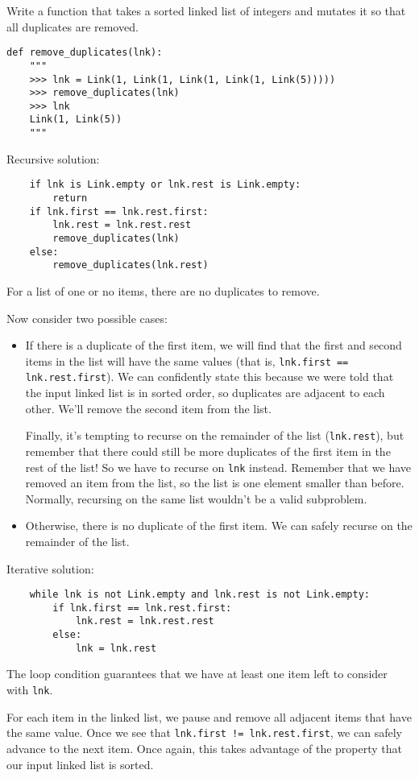 \question
Write a function that takes a sorted linked list of integers and mutates
it so that all duplicates are removed.

\begin{lstlisting}
def remove_duplicates(lnk):
    """
    >>> lnk = Link(1, Link(1, Link(1, Link(1, Link(5)))))
    >>> remove_duplicates(lnk)
    >>> lnk
    Link(1, Link(5))
    """
\end{lstlisting}
\begin{solution}[1.75in]
Recursive solution:
\begin{lstlisting}
    if lnk is Link.empty or lnk.rest is Link.empty:
        return
    if lnk.first == lnk.rest.first:
        lnk.rest = lnk.rest.rest
        remove_duplicates(lnk)
    else:
        remove_duplicates(lnk.rest)
\end{lstlisting}
For a list of one or no items, there are no duplicates to remove.

Now consider two possible cases:
\begin{itemize}
    \item If there is a duplicate of the first item, we will find that the first
        and second items in the list will have the same values (that is,
        \texttt{lnk.first == lnk.rest.first}). We can confidently state this
        because we were told that the input linked list is in sorted order, so
        duplicates are adjacent to each other. We'll remove the second item from
        the list.

        Finally, it's tempting to recurse on the remainder of the list
        (\texttt{lnk.rest}), but remember that there could still be more
        duplicates of the first item in the rest of the list! So we have to
        recurse on \texttt{lnk} instead. Remember that we have removed an item
        from the list, so the list is one element smaller than before. Normally,
        recursing on the same list wouldn't be a valid subproblem.
    \item Otherwise, there is no duplicate of the first item. We can safely
        recurse on the remainder of the list.
\end{itemize}

Iterative solution:
\begin{lstlisting}
    while lnk is not Link.empty and lnk.rest is not Link.empty:
        if lnk.first == lnk.rest.first:
            lnk.rest = lnk.rest.rest
        else:
            lnk = lnk.rest
\end{lstlisting}

The loop condition guarantees that we have at least one item left to consider
with \texttt{lnk}.

For each item in the linked list, we pause and remove all adjacent items that
have the same value. Once we see that \texttt{lnk.first != lnk.rest.first}, we
can safely advance to the next item. Once again, this takes advantage of the
property that our input linked list is sorted.

\end{solution}
